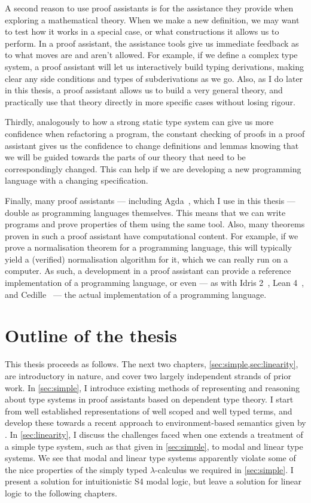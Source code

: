 A second reason to use proof assistants is for the assistance they provide when
exploring a mathematical theory.
When we make a new definition, we may want to test how it works in a special
case, or what constructions it allows us to perform.
In a proof assistant, the assistance tools give us immediate feedback as to what
moves are and aren't allowed.
For example, if we define a complex type system, a proof assistant will let us
interactively build typing derivations, making clear any side conditions and
types of subderivations as we go.
Also, as I do later in this thesis, a proof assistant allows us to build a very
general theory, and practically use that theory directly in more specific cases
without losing rigour.

Thirdly, analogously to how a strong static type system can give us more
confidence when refactoring a program, the constant checking of proofs in a
proof assistant gives us the confidence to change definitions and lemmas knowing
that we will be guided towards the parts of our theory that need to be
correspondingly changed.
This can help if we are developing a new programming language with a changing
specification.

Finally, many proof assistants --- including Agda~\citep{Agda}, which I use in
this thesis --- double as programming languages themselves.
This means that we can write programs and prove properties of them using the same
tool.
Also, many theorems proven in such a proof assistant have computational content.
For example, if we prove a normalisation theorem for a programming language,
this will typically yield a (verified) normalisation algorithm for it, which we
can really run on a computer.
As such, a development in a proof assistant can provide a reference
implementation of a programming language, or even --- as with Idris
2~\citep{Brady21}, Lean 4~\citep{deMU21}, and Cedille~\citep{GRS16} --- the
actual implementation of a programming language.

\section{Outline of the thesis}

This thesis proceeds as follows.
The next two chapters, \cref{sec:simple,sec:linearity}, are introductory in
nature, and cover two largely independent strands of prior work.
In \cref{sec:simple}, I introduce existing methods of representing and reasoning
about type systems in proof assistants based on dependent type theory.
I start from well established representations of well scoped and well typed
terms, and develop these towards a recent approach to environment-based
semantics given by \citet{AACMM21}.
In \cref{sec:linearity}, I discuss the challenges faced when one extends a
treatment of a simple type system, such as that given in \cref{sec:simple}, to
modal and linear type systems.
We see that modal and linear type systems apparently violate some of the nice
properties of the simply typed $\lambda$-calculus we required in
\cref{sec:simple}.
I present a solution for intuitionistic S4 modal logic, but leave a solution for
linear logic to the following chapters.

